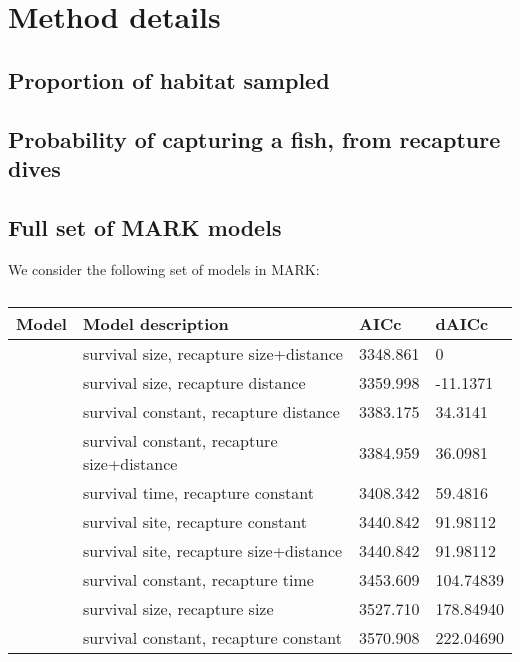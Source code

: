 \documentclass[12pt, oneside]{article}   	%
\begin{document}
\section{Method details}
\subsection*{Proportion of habitat sampled} \label{APP_SEC_ProbHabSampled}

\newpage{}

\subsection*{Probability of capturing a fish, from recapture dives} \label{APP_SEC_ProbR}

\newpage{}

\subsection*{Full set of MARK models} \label{APP_MARKModels}
We consider the following set of models in MARK:
\begin{table}
\begin{centering}
\begin{tabular}{|p{2in}|p{2.5in}|p{0.75in}|p{0.75in}|}
\hline 
\textbf{Model} & \textbf{Model description} & \textbf{AICc} & \textbf{dAICc} \\ \hline
& survival size, recapture size+distance & 3348.861 & 0 \\ \hline
& survival size, recapture distance & 3359.998 & -11.1371 \\ \hline
& survival constant, recapture distance & 3383.175 & 34.3141 \\ \hline
& survival constant, recapture size+distance & 3384.959 & 36.0981 \\ \hline
& survival time, recapture constant & 3408.342 & 59.4816 \\ \hline
& survival site, recapture constant & 3440.842 & 91.98112 \\ \hline
& survival site, recapture size+distance & 3440.842 & 91.98112 \\ \hline
& survival constant, recapture time & 3453.609 & 104.74839 \\ \hline
& survival size, recapture size & 3527.710 & 178.84940 \\ \hline
& survival constant, recapture constant & 3570.908 & 222.04690 \\ \hline
\end{tabular}
\end{centering}
\caption{}\label{APP_TAB_MARKmodels}
\end{table}
\end{document}
